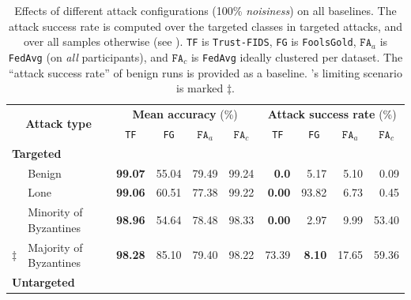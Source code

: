 \begin{table}[t]
      \centering
          \caption{
            Effects of different attack configurations (100\% \emph{noisiness}) on all baselines.
            The attack success rate is computed over the targeted classes in targeted attacks, and over all samples otherwise (see ).
            \texttt{TF} is \texttt{Trust-FIDS}, \texttt{FG} is \texttt{FoolsGold}, $\texttt{FA}_a$ is \texttt{FedAvg} (on \emph{all} participants), and $\texttt{FA}_c$ is \texttt{FedAvg} ideally clustered per dataset.
            The ``attack success rate'' of benign runs is provided as a baseline.
            \thecontrib's limiting scenario is marked $\ddagger$.
          \label{tbl:baselines_results}}
      \bigskip
      \setlength\tabcolsep{1ex}
      \begin{tabular}{ll|rrrr|rrrr}
          \toprule %
          \multicolumn{2}{c|}{\multirow{2}{*}{\textbf{Attack type}}} & \multicolumn{4}{c|}{\textbf{Mean accuracy} (\%)} & \multicolumn{4}{c}{\textbf{Attack success rate} (\%)} \\
          & & \multicolumn{1}{c}{\texttt{TF}} & \multicolumn{1}{c}{\texttt{FG}} & \multicolumn{1}{c}{$\texttt{FA}_a$} & \multicolumn{1}{c|}{$\texttt{FA}_c$} & \multicolumn{1}{c}{\texttt{TF}} & \multicolumn{1}{c}{\texttt{FG}} & \multicolumn{1}{c}{$\texttt{FA}_a$} & \multicolumn{1}{c}{$\texttt{FA}_c$} \\
          \midrule %
          \multicolumn{2}{l|}{\textbf{Targeted}} & & & & & & & & \\
            & Benign & \textbf{99.07} & 55.04 & 79.49 & 99.24 & \textbf{0.0}  & 5.17 & 5.10 & 0.09 \\
            & Lone & \textbf{99.06} & 60.51 & 77.38 & 99.22 & \textbf{0.00} & 93.82 & 6.73 & 0.45 \\
           & Minority of Byzantines & \textbf{98.96} & 54.64 & 78.48 & 98.33 & \textbf{0.00} & 2.97 & 9.99 & 53.40 \\
            $\ddagger$ & Majority of Byzantines & \textbf{98.28} & 85.10 & 79.40 & 98.22 & 73.39 & \textbf{8.10} & 17.65 & 59.36 \\
          \midrule %
          \multicolumn{2}{l|}{\textbf{Untargeted}} & & & & & & & & \\

\end{tabular}
\end{table}
